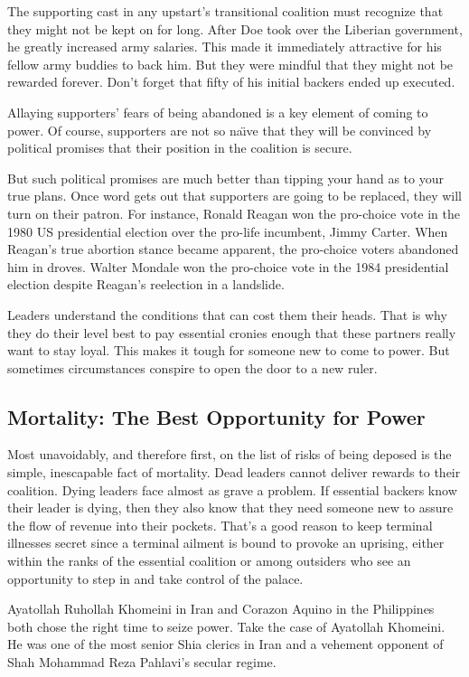 \documentclass[10pt]{article}
\begin{document}
{\large The supporting cast in any upstart's transitional coalition must
recognize that they might not be kept on for long. After Doe took over the
Liberian government, he greatly increased army salaries. This made it immediately
attractive for his fellow army buddies to back him. But they were mindful that
they might not be rewarded forever. Don't forget that fifty of his initial
backers ended up executed.}

{\large Allaying supporters' fears of being abandoned is a key element of coming
to power. Of course, supporters are not so na\"{\i}ve that they will be convinced
by political promises that their position in the coalition is secure.}

{\large But such political promises are much better than tipping your hand as to
your true plans. Once word gets out that supporters are going to be replaced,
they will turn on their patron. For instance, Ronald Reagan won the pro-choice
vote in the 1980 US presidential election over the pro-life incumbent, Jimmy
Carter. When Reagan's true abortion stance became apparent, the pro-choice voters
abandoned him in droves. Walter Mondale won the pro-choice vote in the 1984
presidential election despite Reagan's reelection in a landslide.}

{\large Leaders understand the conditions that can cost them their heads. That
is why they do their level best to pay essential cronies enough that these
partners really want to stay loyal. This makes it tough for someone new to come
to power. But sometimes circumstances conspire to open the door to a new ruler.}

\subsection{Mortality: The Best Opportunity for Power}

{\large Most unavoidably, and therefore first, on the list of risks of being
deposed is the simple, inescapable fact of mortality. Dead leaders cannot deliver
rewards to their coalition. Dying leaders face almost as grave a problem. If
essential backers know their leader is dying, then they also know that they need
someone new to assure the flow of revenue into their pockets. That's a good
reason to keep terminal illnesses secret since a terminal ailment is bound to
provoke an uprising, either within the ranks of the essential coalition or among
outsiders who see an opportunity to step in and take control of the palace.}

{\large Ayatollah Ruhollah Khomeini in Iran and Corazon Aquino in the
Philippines both chose the right time to seize power. Take the case of Ayatollah
Khomeini. He was one of the most senior Shia clerics in Iran and a vehement
opponent of Shah Mohammad Reza Pahlavi's secular regime.}
\end{document}
